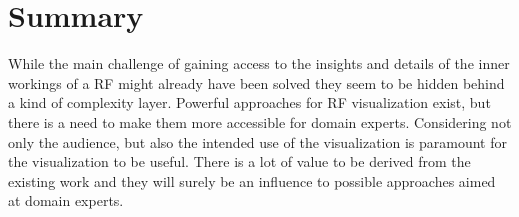 \documentclass[a4paper, 12pt]{article}
\begin{document}
\section{Summary}
While the main challenge of gaining access to the insights and details of the inner workings
of a RF might already have been solved they seem to be hidden behind a kind of complexity
layer. Powerful approaches for RF visualization exist, but there is a need to make them more
accessible for domain experts. Considering not only the audience, but also the intended
use of the visualization is paramount for the visualization to be useful. There is a lot
of value to be derived from the existing work and they will surely be an influence to
possible approaches aimed at domain experts.

\clearpage


\end{document}
